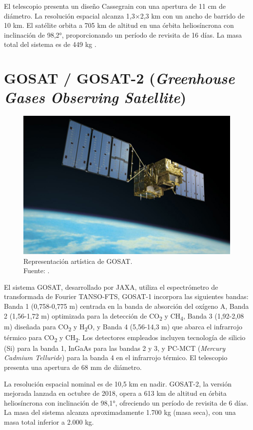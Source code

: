 El telescopio presenta un diseño Cassegrain con una apertura de 11 cm de diámetro. La resolución espacial alcanza 1,3×2,3 km con un ancho de barrido de 10 km. El satélite orbita a 705 km de altitud en una órbita heliosíncrona con inclinación de 98,2°, proporcionando un período de revisita de 16 días. La masa total del sistema es de 449 kg \cite{eoportal_oco2_2024}.

\section{GOSAT / GOSAT-2 (\textit{Greenhouse Gases Observing Satellite})}

\begin{figure}[H]
    \centering
    \includegraphics[width=0.8\linewidth]{2.Misiones_Semejantes/gosat_main_001.jpg}
    \caption{Representación artística de GOSAT. \\Fuente: \cite{jaxa_gosat_representation}.
}
\end{figure}

El sistema GOSAT, desarrollado por JAXA, utiliza el espectrómetro de transformada de Fourier TANSO-FTS, GOSAT-1 incorpora las siguientes bandas: Banda 1 (0,758-0,775 \textmu m) centrada en la banda de absorción del oxígeno A, Banda 2 (1,56-1,72 \textmu m) optimizada para la detección de CO\textsubscript{2} y CH\textsubscript{4}, Banda 3 (1,92-2,08 \textmu m) diseñada para CO\textsubscript{2} y H\textsubscript{2}O, y Banda 4 (5,56-14,3 \textmu m) que abarca el infrarrojo térmico para CO\textsubscript{2} y CH\textsubscript{2}. Los detectores empleados incluyen tecnología de silicio (Si) para la banda 1, InGaAs para las bandas 2 y 3, y PC-MCT (\textit{Mercury Cadmium Telluride}) para la banda 4 en el infrarrojo térmico. El telescopio presenta una apertura de 68 mm de diámetro.

La resolución espacial nominal es de 10,5 km en nadir. GOSAT-2, la versión mejorada lanzada en octubre de 2018, opera a 613 km de altitud en órbita heliosíncrona con inclinación de 98,1°, ofreciendo un período de revisita de 6 días. La masa del sistema alcanza aproximadamente 1.700 kg (masa seca), con una masa total inferior a 2.000 kg.

